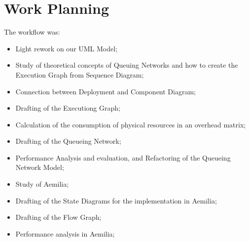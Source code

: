 \chapter{\textbf{Work Planning}}

The workflow was:

\begin{itemize}
	\item Light rework on our UML Model;
	\item Study of theoretical concepts of Queuing Networks and how to 			create the Execution Graph from Sequence Diagram;
	\item Connection between Deployment and Component Diagram;
	\item Drafting of the Executiong Graph;
	\item Calculation of the consumption of physical resources in an 			overhead matrix;
	\item Drafting of the Queueing Network;
	\item Performance Analysis and evaluation, and Refactoring of the 			Queueing Network Model;
	\item Study of Aemilia;
	\item Drafting of the State Diagrams for the implementation in 				Aemilia;
	\item Drafting of the Flow Graph;
	\item Performance analysis in Aemilia;	
\end{itemize}

